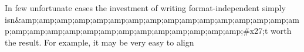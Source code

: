 
In few unfortunate cases the investment of writing format-independent \latex simply isn&amp;amp;amp;amp;amp;amp;amp;amp;amp;amp;amp;amp;amp;amp;amp;amp;amp;amp;amp;amp;amp;amp;amp;amp;amp;amp;amp;amp;amp;#x27;t worth the result. For example, it may be very easy to align 